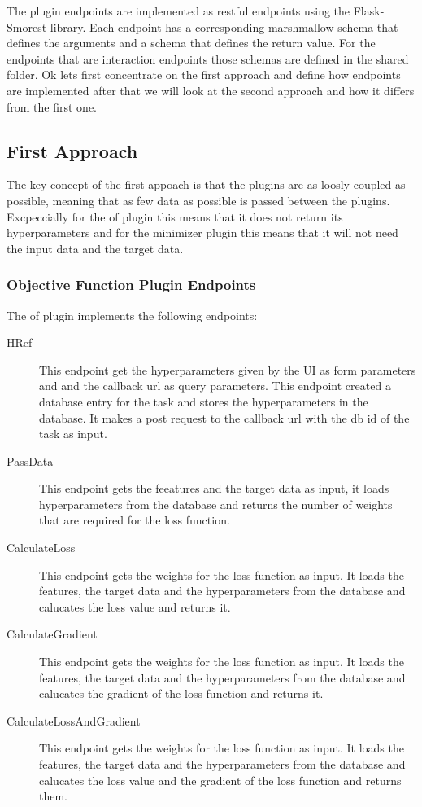 \documentclass[
  a4paper,  %
  twoside,  %
  bibliography=totoc,
  headsepline,
  cleardoublepage=empty,
  parskip=half,
  draft=false
]{scrbook}
\begin{document}
The plugin endpoints are implemented as \gls{rest}ful endpoints using the Flask-Smorest library.
Each endpoint has a corresponding marshmallow schema that defines the arguments and a schema that defines the return value.
For the endpoints that are interaction endpoints those schemas are defined in the shared folder.
Ok lets first concentrate on the first approach and define how endpoints are implemented
after that we will look at the second approach and how it differs from the first one.

\subsection{First Approach}
\label{sec:firstApproach}
The key concept of the first appoach is that the plugins are as loosly coupled as possible, meaning that as few data as possible is passed between the plugins.
Excpeccially for the \gls{of} plugin this means that it does not return its hyperparameters and for the minimizer plugin this means that it will not need the input data and the target data.

\subsubsection{Objective Function Plugin Endpoints}
\label{sec:ofPluginEndpoints}
The \gls{of} plugin implements the following endpoints:

\begin{description}
  \item[HRef] This endpoint get the hyperparameters given by the UI as form parameters and and the callback url as query parameters. This endpoint created a database entry for the task and stores the hyperparameters in the database. It makes a post request to the callback url with the db id of the task as input.
  \item[PassData] This endpoint gets the feeatures and the target data as input, it loads hyperparameters from the database and returns the number of weights that are required for the loss function.
  \item[CalculateLoss] This endpoint gets the weights for the loss function as input. It loads the features, the target data and the hyperparameters from the database and calucates the loss value and returns it.
  \item[CalculateGradient] This endpoint gets the weights for the loss function as input. It loads the features, the target data and the hyperparameters from the database and calucates the gradient of the loss function and returns it.
  \item[CalculateLossAndGradient] This endpoint gets the weights for the loss function as input. It loads the features, the target data and the hyperparameters from the database and calucates the loss value and the gradient of the loss function and returns them.
\end{description}
\end{document}
